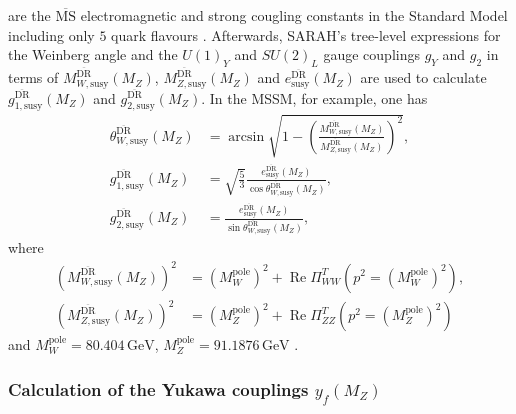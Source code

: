 \documentclass[final,3p,times,pdflatex]{elsarticle}
\newcommand{\textoverline}[1]{$\overline{\mbox{#1}}$}
\newcommand{\DRbar}{\textoverline{DR}\xspace}
\newcommand{\MSbar}{\textoverline{MS}\xspace}
\newcommand{\unit}[1]{\,\text{#1}}      %
\DeclareMathOperator{\re}{Re}
\begin{document}
%
are the \MSbar electromagnetic and strong cougling constants in the
Standard Model including only $5$ quark flavours
\cite{Beringer:1900zz}.  Afterwards, SARAH's tree-level expressions
for the Weinberg angle and the $U(1)_Y$ and $SU(2)_L$ gauge couplings
$g_Y$ and $g_2$ in terms of $M_{W,\text{susy}}^{\text{\DRbar}}(M_Z)$,
$M_{Z,\text{susy}}^{\text{\DRbar}}(M_Z)$ and
$e_{\text{susy}}^{\text{\DRbar}}(M_Z)$ are used to calculate
$g_{1,\text{susy}}^{\text{\DRbar}}(M_Z)$ and
$g_{2,\text{susy}}^{\text{\DRbar}}(M_Z)$.  In the MSSM, for example,
one has
%
\begin{align}
  \theta_{W,\text{susy}}^{\text{\DRbar}}(M_Z) &=
  \arcsin\sqrt{1 - \left(\frac{M_{W,\text{susy}}^{\text{\DRbar}}(M_Z)}{M_{Z,\text{susy}}^{\text{\DRbar}}(M_Z)}\right)^2} ,\\
  g_{1,\text{susy}}^{\text{\DRbar}}(M_Z) &=
  \sqrt{\frac{5}{3}} \frac{e_{\text{susy}}^{\text{\DRbar}}(M_Z)}{\cos\theta_{W,\text{susy}}^{\text{\DRbar}}(M_Z)} ,\\
  g_{2,\text{susy}}^{\text{\DRbar}}(M_Z) &=
  \frac{e_{\text{susy}}^{\text{\DRbar}}(M_Z)}{\sin\theta_{W,\text{susy}}^{\text{\DRbar}}(M_Z)} ,
\end{align}
%
where
%
\begin{align}
  \left(M_{W,\text{susy}}^{\text{\DRbar}}(M_Z)\right)^2 &=
  \left(M_W^{\text{pole}}\right)^2 + \re \Pi_{WW}^T(p^2 = (M_W^{\text{pole}})^2) ,\\
  \left(M_{Z,\text{susy}}^{\text{\DRbar}}(M_Z)\right)^2 &=
  \left(M_Z^{\text{pole}}\right)^2 + \re \Pi_{ZZ}^T(p^2 = (M_Z^{\text{pole}})^2)
\end{align}
%
and $M_W^{\text{pole}} = 80.404\unit{GeV}$, $M_Z^{\text{pole}} =
91.1876\unit{GeV}$ \cite{Beringer:1900zz}.

\subsubsection{Calculation of the Yukawa couplings $y_f(M_Z)$}
\label{sec:calculation-of-yukawa-couplings}
\end{document}
